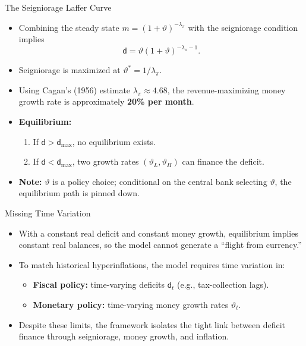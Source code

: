\documentclass[11pt,aspectratio=169]{beamer}
\begin{document}
\begin{frame}{The Seigniorage Laffer Curve}
\small
\begin{itemize}
    \item Combining the steady state \(m=(1+\vartheta)^{-\lambda_\pi}\) with the seigniorage condition implies
    \begin{equation}
        \mathsf{d} = \vartheta (1+\vartheta)^{-\lambda_\pi - 1}.
        \label{dv}
    \end{equation}
    \item Seigniorage is maximized at \(\vartheta^{*} = 1/\lambda_\pi\).
    \item Using Cagan’s (1956) estimate \(\lambda_\pi \approx 4.68\), the revenue-maximizing money growth rate is approximately \textbf{20\% per month}.
    \item \textbf{Equilibrium:}
    \begin{enumerate}
        \item If \(\mathsf{d} > \mathsf{d}_{\max}\), no equilibrium exists.
        \item If \(\mathsf{d} < \mathsf{d}_{\max}\), two growth rates \((\vartheta_L,\vartheta_H)\) can finance the deficit.
    \end{enumerate}
    \item \textbf{Note:} \(\vartheta\) is a policy choice; conditional on the central bank selecting \(\vartheta\), the equilibrium path is pinned down.
\end{itemize}
\end{frame}

\begin{frame}{Missing Time Variation}
\small
\begin{itemize}
    \item With a constant real deficit and constant money growth, equilibrium implies constant real balances, so the model cannot generate a \enquote{flight from currency.}
    \vspace{0.4em}
    \item To match historical hyperinflations, the model requires time variation in:
    \begin{itemize}
        \item \textbf{Fiscal policy:} time-varying deficits \(\mathsf{d}_t\) (e.g., tax-collection lags).
        \item \textbf{Monetary policy:} time-varying money growth rates \(\vartheta_t\).
    \end{itemize}
\vspace{0.4em}
\item Despite these limits, the framework isolates the tight link between deficit finance through seigniorage, money growth, and inflation.
\end{itemize}
\end{frame}
\end{document}
